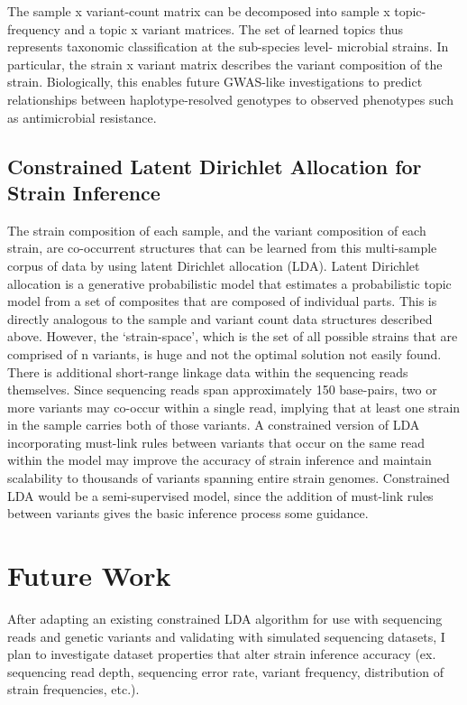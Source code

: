 \documentclass{article}
\begin{document}
\bigskip

The sample x variant-count matrix can be decomposed into sample x topic-frequency and a topic x variant matrices. The set of learned topics thus represents taxonomic classification at the sub-species level- microbial strains. In particular, the strain x variant matrix describes the variant composition of the strain. Biologically, this enables future GWAS-like investigations to predict relationships between haplotype-resolved genotypes to observed phenotypes such as antimicrobial resistance.

\subsection{Constrained Latent Dirichlet Allocation for Strain Inference}

The strain composition of each sample, and the variant composition of each strain, are co-occurrent structures that can be learned from this multi-sample corpus of data by using latent Dirichlet allocation (LDA). Latent Dirichlet allocation is a generative probabilistic model that estimates a probabilistic topic model from a set of composites that are composed of individual parts. This is directly analogous to the sample and variant count data structures described above. However, the ‘strain-space’, which is the set of all possible strains that are comprised of n variants, is huge and not the optimal solution not easily found. There is additional short-range linkage data within the sequencing reads themselves. Since sequencing reads span approximately 150 base-pairs, two or more variants may co-occur within a single read, implying that at least one strain in the sample carries both of those variants. A constrained version of LDA incorporating must-link rules between variants that occur on the same read within the model may improve the accuracy of strain inference and maintain scalability to thousands of variants spanning entire strain genomes. Constrained LDA would be a semi-supervised model, since the addition of must-link rules between variants gives the basic inference process some guidance. 

\section{Future Work}

After adapting an existing constrained LDA algorithm for use with sequencing reads and genetic variants and validating with simulated sequencing datasets, I plan to investigate dataset properties that alter strain inference accuracy (ex. sequencing read depth, sequencing error rate, variant frequency, distribution of strain frequencies, etc.). 
\end{document}
